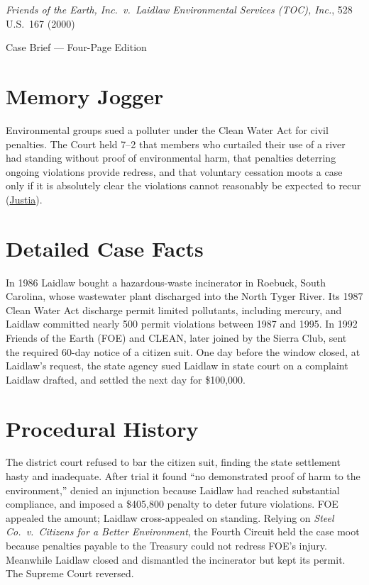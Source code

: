 \documentclass[12pt]{article}
\begin{document}
\begin{center}
{\LARGE \textit{Friends of the Earth, Inc.\ v.\ Laidlaw Environmental Services (TOC), Inc.}, 528 U.S.\ 167 (2000)\par}
\vspace{0.8em}
{\large Case Brief --- Four-Page Edition\par}
\end{center}
\vspace{1em}

\section{Memory Jogger}

Environmental groups sued a polluter under the Clean Water Act for civil penalties. The Court held 7--2 that members who curtailed their use of a river had standing without proof of environmental harm, that penalties deterring ongoing violations provide redress, and that voluntary cessation moots a case only if it is absolutely clear the violations cannot reasonably be expected to recur (\href{https://supreme.justia.com/cases/federal/us/528/167/}{Justia}).

\section{Detailed Case Facts}

In 1986 Laidlaw bought a hazardous-waste incinerator in Roebuck, South Carolina, whose wastewater plant discharged into the North Tyger River. Its 1987 Clean Water Act discharge permit limited pollutants, including mercury, and Laidlaw committed nearly 500 permit violations between 1987 and 1995. In 1992 Friends of the Earth (FOE) and CLEAN, later joined by the Sierra Club, sent the required 60-day notice of a citizen suit. One day before the window closed, at Laidlaw's request, the state agency sued Laidlaw in state court on a complaint Laidlaw drafted, and settled the next day for \$100,000.

\section{Procedural History}

The district court refused to bar the citizen suit, finding the state settlement hasty and inadequate. After trial it found ``no demonstrated proof of harm to the environment,'' denied an injunction because Laidlaw had reached substantial compliance, and imposed a \$405,800 penalty to deter future violations. FOE appealed the amount; Laidlaw cross-appealed on standing. Relying on \textit{Steel Co.\ v.\ Citizens for a Better Environment}, the Fourth Circuit held the case moot because penalties payable to the Treasury could not redress FOE's injury. Meanwhile Laidlaw closed and dismantled the incinerator but kept its permit. The Supreme Court reversed.
\end{document}
